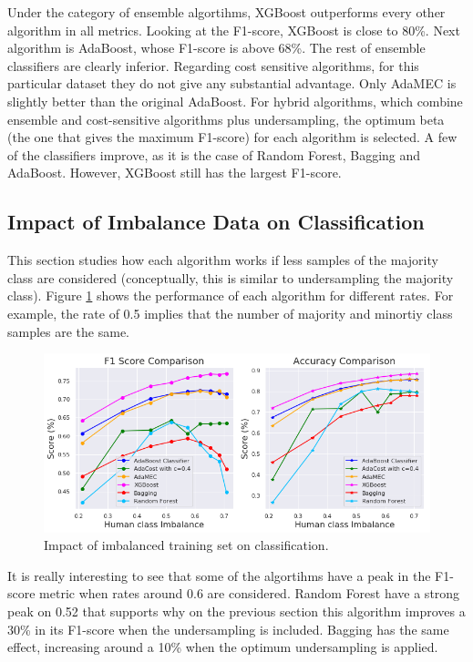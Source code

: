\documentclass[conference]{IEEEtran}
\begin{document}
Under the category of ensemble algortihms, XGBoost outperforms every other algorithm in all metrics. Looking at the F1-score, XGBoost is close to 80\%. Next algorithm is AdaBoost, whose F1-score is above 68\%. The rest of ensemble classifiers are clearly inferior. Regarding cost sensitive algorithms, for this particular dataset they do not give any substantial advantage. Only AdaMEC is slightly better than the original AdaBoost. For hybrid algorithms, which combine ensemble and cost-sensitive algorithms plus undersampling, the optimum beta (the one that gives the maximum F1-score) for each algorithm is selected. A few of the classifiers improve, as it is the case of Random Forest, Bagging and AdaBoost. However, XGBoost still has the largest F1-score.

\subsection{Impact of Imbalance Data on Classification}

This section studies how each algorithm works if less samples of the majority class are considered (conceptually, this is similar to undersampling the majority class). Figure \ref{Fig:ImbalanceComparison} shows the performance of each algorithm for different rates. For example, the rate of 0.5 implies that the number of majority and minortiy class samples are the same.

\begin{figure}[htbp]
\centerline{\includegraphics[scale=0.35]{pictures/Imbalance_Comparison.png}}
\caption{Impact of imbalanced training set on classification.}
\label{Fig:ImbalanceComparison}
\end{figure}

It is really interesting to see that some of the algortihms have a peak in the F1-score metric when rates around 0.6 are considered. Random Forest have a strong peak on 0.52 that supports why on the previous section this algorithm improves a 30\% in its F1-score when the undersampling is included. Bagging has the same effect, increasing around a 10\% when the optimum undersampling is applied.  
\end{document}
